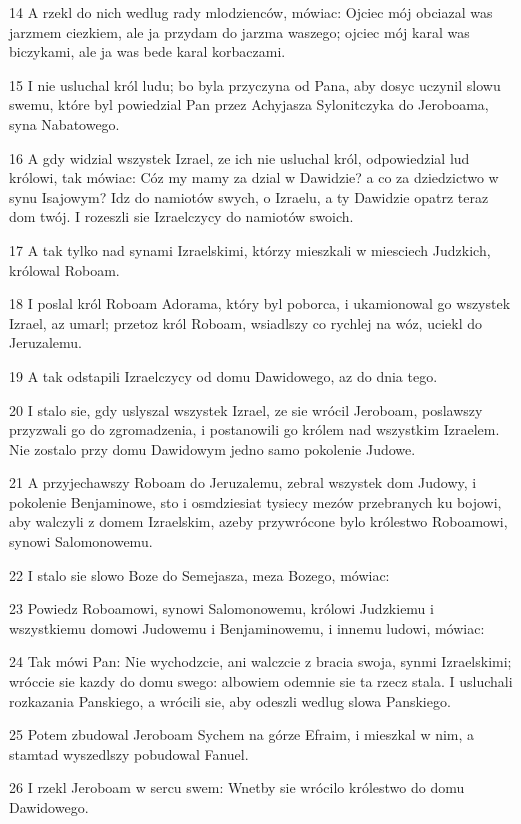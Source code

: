 \par 14 A rzekl do nich wedlug rady mlodzienców, mówiac: Ojciec mój obciazal was jarzmem ciezkiem, ale ja przydam do jarzma waszego; ojciec mój karal was biczykami, ale ja was bede karal korbaczami.
\par 15 I nie usluchal król ludu; bo byla przyczyna od Pana, aby dosyc uczynil slowu swemu, które byl powiedzial Pan przez Achyjasza Sylonitczyka do Jeroboama, syna Nabatowego.
\par 16 A gdy widzial wszystek Izrael, ze ich nie usluchal król, odpowiedzial lud królowi, tak mówiac: Cóz my mamy za dzial w Dawidzie? a co za dziedzictwo w synu Isajowym? Idz do namiotów swych, o Izraelu, a ty Dawidzie opatrz teraz dom twój. I rozeszli sie Izraelczycy do namiotów swoich.
\par 17 A tak tylko nad synami Izraelskimi, którzy mieszkali w miesciech Judzkich, królowal Roboam.
\par 18 I poslal król Roboam Adorama, który byl poborca, i ukamionowal go wszystek Izrael, az umarl; przetoz król Roboam, wsiadlszy co rychlej na wóz, uciekl do Jeruzalemu.
\par 19 A tak odstapili Izraelczycy od domu Dawidowego, az do dnia tego.
\par 20 I stalo sie, gdy uslyszal wszystek Izrael, ze sie wrócil Jeroboam, poslawszy przyzwali go do zgromadzenia, i postanowili go królem nad wszystkim Izraelem. Nie zostalo przy domu Dawidowym jedno samo pokolenie Judowe.
\par 21 A przyjechawszy Roboam do Jeruzalemu, zebral wszystek dom Judowy, i pokolenie Benjaminowe, sto i osmdziesiat tysiecy mezów przebranych ku bojowi, aby walczyli z domem Izraelskim, azeby przywrócone bylo królestwo Roboamowi, synowi Salomonowemu.
\par 22 I stalo sie slowo Boze do Semejasza, meza Bozego, mówiac:
\par 23 Powiedz Roboamowi, synowi Salomonowemu, królowi Judzkiemu i wszystkiemu domowi Judowemu i Benjaminowemu, i innemu ludowi, mówiac:
\par 24 Tak mówi Pan: Nie wychodzcie, ani walczcie z bracia swoja, synmi Izraelskimi; wróccie sie kazdy do domu swego: albowiem odemnie sie ta rzecz stala. I usluchali rozkazania Panskiego, a wrócili sie, aby odeszli wedlug slowa Panskiego.
\par 25 Potem zbudowal Jeroboam Sychem na górze Efraim, i mieszkal w nim, a stamtad wyszedlszy pobudowal Fanuel.
\par 26 I rzekl Jeroboam w sercu swem: Wnetby sie wrócilo królestwo do domu Dawidowego.
